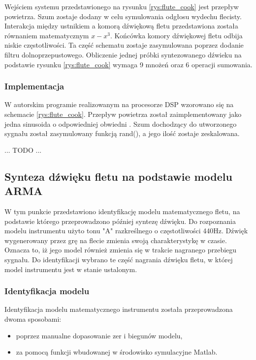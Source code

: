 Wejściem systemu przedstawionego na rysunku \ref{rys:flute_cook} jest przepływ powietrza. Szum zostaje dodany w celu symulowania odgłosu wydechu flecisty. Interakcja między ustnikiem a komorą dźwiękową fletu przedstawiona została równaniem matematycznym $x-x^3$. Końcówka komory dźwiękowej fletu odbija niskie częstotliwości. Ta część schematu zostaje zasymulowana poprzez dodanie filtru dolnoprzepustowego. Obliczenie jednej próbki syntezowanego dźwieku na podstawie rysunku \ref{rys:flute_cook} wymaga 9 mnożeń oraz 6 operacji sumowania.

\subsubsection{Implementacja}
W autorskim programie realizowanym na procesorze DSP wzorowano się na schemacie \ref{rys:flute_cook}. Przepływ powietrza został zaimplementowany jako jedna sinusoida o odpowiedniej obwiedni \cite{flute_prezka}. Szum dochodzący do utworzonego sygnału został zasymulowany funkcją rand(), a jego ilość zostaje zeskalowana. 

... TODO ...

\subsection{Synteza dźwięku fletu na podstawie modelu ARMA}
W tym punkcie przedstawiono identyfikację modelu matematycznego fletu, na podstawie którego przeprowadzono później syntezę dźwięku. Do rozpoznania modelu instrumentu użyto tonu "A" razkreślnego o częstotliwości 440Hz. Dźwięk wygenerowany przez grę na flecie zmienia swoją charakterystykę w czasie. Oznacza to, iż jego model również zmienia się w trakcie nagranego przebiegu sygnału. Do identyfikacji wybrano te część nagrania dźwięku fletu, w której model instrumentu jest w stanie ustalonym.

\subsubsection{Identyfikacja modelu}
Identyfikacja modelu matematycznego instrumentu została przeprowadzona dwoma sposobami: 
\begin{itemize}
	\item poprzez manualne dopasowanie zer i biegunów modelu, 
	\item za pomocą funkcji wbudowanej w środowisko symulacyjne Matlab.
\end{itemize}

